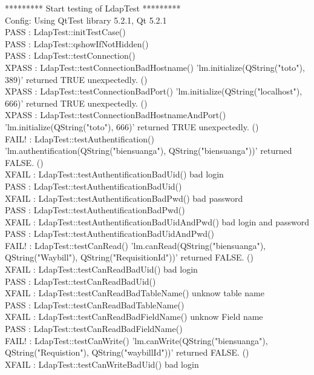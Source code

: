 \documentclass[11pt,fleqn]{report}
\begin{document}
********* Start testing of LdapTest *********\\
Config: Using QtTest library 5.2.1, Qt 5.2.1\\
PASS   : LdapTest::initTestCase()\\
PASS   : LdapTest::qshowIfNotHidden()\\
PASS   : LdapTest::testConnection()\\
XPASS  : LdapTest::testConnectionBadHostname() 'lm.initialize(QString("toto"), 389)' returned TRUE unexpectedly. ()\\
XPASS  : LdapTest::testConnectionBadPort() 'lm.initialize(QString("localhost"), 666)' returned TRUE unexpectedly. ()\\
XPASS  : LdapTest::testConnectionBadHostnameAndPort() 'lm.initialize(QString("toto"), 666)' returned TRUE unexpectedly. ()\\
FAIL!  : LdapTest::testAuthentification() 'lm.authentification(QString("biensuanga"), QString("biensuanga"))' returned FALSE. ()\\
XFAIL  : LdapTest::testAuthentificationBadUid() bad login\\
PASS   : LdapTest::testAuthentificationBadUid()\\
XFAIL  : LdapTest::testAuthentificationBadPwd() bad password\\
PASS   : LdapTest::testAuthentificationBadPwd()\\
XFAIL  : LdapTest::testAuthentificationBadUidAndPwd() bad login and password\\
PASS   : LdapTest::testAuthentificationBadUidAndPwd()\\
FAIL!  : LdapTest::testCanRead() 'lm.canRead(QString("biensuanga"), QString("Waybill"), QString("RequisitionId"))' returned FALSE. ()\\
XFAIL  : LdapTest::testCanReadBadUid() bad login\\
PASS   : LdapTest::testCanReadBadUid()\\
XFAIL  : LdapTest::testCanReadBadTableName() unknow table name\\
PASS   : LdapTest::testCanReadBadTableName()\\
XFAIL  : LdapTest::testCanReadBadFieldName() unknow Field name\\
PASS   : LdapTest::testCanReadBadFieldName()\\
FAIL!  : LdapTest::testCanWrite() 'lm.canWrite(QString("biensuanga"), QString("Requistion"), QString("waybillId"))' returned FALSE. ()\\
XFAIL  : LdapTest::testCanWriteBadUid() bad login\\
\end{document}
